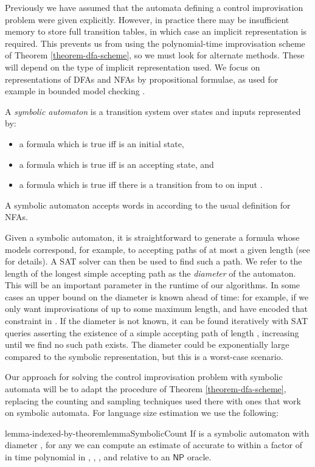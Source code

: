 \documentclass[a4paper,USenglish,numberwithinsect]{lipics}
\theoremstyle{plain}
\theoremstyle{definition}
\newcommand{\NP}{\ensuremath{\mathsf{NP}}}
\begin{document}
Previously we have assumed that the automata defining a control
improvisation problem were given explicitly. However, in practice
there may be insufficient memory to store full transition tables, in
which case an implicit representation is required. This prevents us from using
the polynomial-time improvisation scheme of Theorem
\ref{theorem-dfa-scheme}, so we must look for alternate methods. These
will depend on the type of implicit representation used. We focus on
representations of DFAs and NFAs by propositional formulae, as used
for example in bounded model checking \cite{bmc}. 
\begin{definition}
A \emph{symbolic automaton} is a transition system over states  and inputs  represented by:
\begin{itemize}
\item a formula  which is true iff  is an initial state,
\item a formula  which is true iff  is an accepting state, and
\item a formula  which is true iff there is a transition from  to  on input  .
\end{itemize}
A symbolic automaton accepts words in  according to the usual definition for NFAs.
\end{definition}

Given a symbolic automaton, it is straightforward to generate a
formula whose models correspond, for example, to accepting paths of at
most a given length (see \cite{bmc} for details). A SAT solver can
then be used to find such a path. We refer to the length of the
longest simple accepting path as the \emph{diameter} of the
automaton. This will be an important parameter in the runtime of our
algorithms. In some cases an upper bound on the diameter is known
ahead of time: for example, if we only want improvisations of up to
some maximum length, and have encoded that constraint in
. If the diameter is not known, it can be found
iteratively with SAT queries asserting the existence of a simple
accepting path of length , increasing  until we find no such
path exists. The diameter could be exponentially large compared to the
symbolic representation, but this is a worst-case scenario. 

Our approach for solving the control improvisation problem with symbolic automata will be to adapt the procedure of Theorem \ref{theorem-dfa-scheme}, replacing the counting and sampling techniques used there with ones that work on symbolic automata. For language size estimation we use the following:
\begin{restatable}{lemma-indexed-by-theorem}{lemmaSymbolicCount} \label{lemma:symbolic-count}
If  is a symbolic automaton with diameter , for any  we can compute an estimate of  accurate to within a factor of  in time polynomial in , , , and  relative to an {\NP} oracle.
\end{restatable}
\end{document}
